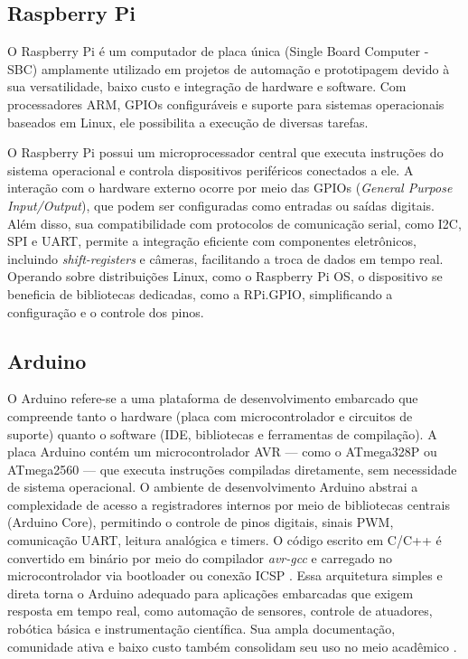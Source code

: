 \documentclass[journal]{IEEEtran} %
\begin{document}
\subsection{Raspberry Pi}

O Raspberry Pi é um computador de placa única (Single Board Computer - SBC) amplamente utilizado em projetos de automação e prototipagem devido à sua versatilidade, baixo custo e integração de hardware e software. Com processadores ARM, GPIOs configuráveis e suporte para sistemas operacionais baseados em Linux, ele possibilita a execução de diversas tarefas.

O Raspberry Pi possui um microprocessador central que executa instruções do sistema operacional e controla dispositivos periféricos conectados a ele. A interação com o hardware externo ocorre por meio das GPIOs (\textit{General Purpose Input/Output}), que podem ser configuradas como entradas ou saídas digitais. Além disso, sua compatibilidade com protocolos de comunicação serial, como I2C, SPI e UART, permite a integração eficiente com componentes eletrônicos, incluindo \textit{shift-registers} e câmeras, facilitando a troca de dados em tempo real. Operando sobre distribuições Linux, como o Raspberry Pi OS, o dispositivo se beneficia de bibliotecas dedicadas, como a RPi.GPIO, simplificando a configuração e o controle dos pinos.

\subsection{Arduino}

O Arduino refere-se a uma plataforma de desenvolvimento embarcado que compreende tanto o hardware (placa com microcontrolador e circuitos de suporte) quanto o software (IDE, bibliotecas e ferramentas de compilação). A placa Arduino contém um microcontrolador AVR — como o ATmega328P ou ATmega2560 — que executa instruções compiladas diretamente, sem necessidade de sistema operacional. O ambiente de desenvolvimento Arduino abstrai a complexidade de acesso a registradores internos por meio de bibliotecas centrais (Arduino Core), permitindo o controle de pinos digitais, sinais PWM, comunicação UART, leitura analógica e timers. O código escrito em C/C++ é convertido em binário por meio do compilador \textit{avr-gcc} e carregado no microcontrolador via bootloader ou conexão ICSP \cite{dunbar2024arduino}. Essa arquitetura simples e direta torna o Arduino adequado para aplicações embarcadas que exigem resposta em tempo real, como automação de sensores, controle de atuadores, robótica básica e instrumentação científica. Sua ampla documentação, comunidade ativa e baixo custo também consolidam seu uso no meio acadêmico \cite{prabowo2023implementation}.
\end{document}
